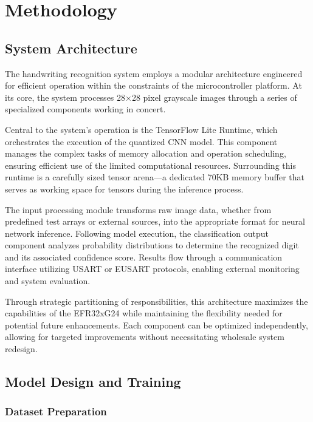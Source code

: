 \documentclass[
  9pt,
  letterpaper,
  abstract,
  titlepage]{scrbook}
\begin{document}
\section{Methodology}\label{methodology}

\subsection{System Architecture}\label{system-architecture}

The handwriting recognition system employs a modular architecture
engineered for efficient operation within the constraints of the
microcontroller platform. At its core, the system processes 28×28 pixel
grayscale images through a series of specialized components working in
concert.

Central to the system's operation is the TensorFlow Lite Runtime, which
orchestrates the execution of the quantized CNN model. This component
manages the complex tasks of memory allocation and operation scheduling,
ensuring efficient use of the limited computational resources.
Surrounding this runtime is a carefully sized tensor arena---a dedicated
70KB memory buffer that serves as working space for tensors during the
inference process.

The input processing module transforms raw image data, whether from
predefined test arrays or external sources, into the appropriate format
for neural network inference. Following model execution, the
classification output component analyzes probability distributions to
determine the recognized digit and its associated confidence score.
Results flow through a communication interface utilizing USART or EUSART
protocols, enabling external monitoring and system evaluation.

Through strategic partitioning of responsibilities, this architecture
maximizes the capabilities of the EFR32xG24 while maintaining the
flexibility needed for potential future enhancements. Each component can
be optimized independently, allowing for targeted improvements without
necessitating wholesale system redesign.

\subsection{Model Design and Training}\label{model-design-and-training}

\subsubsection{Dataset Preparation}\label{dataset-preparation}
\end{document}
